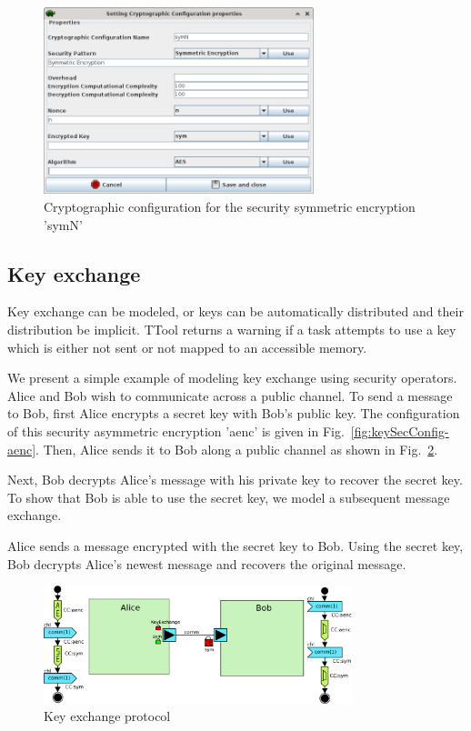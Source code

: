 \documentclass{llncs}
\begin{document}
\begin{figure}[htbp]
	\centering	\includegraphics[width=0.7\textwidth]{figures/securityStuff/encrypt-config-nonce-symN.png}
	\caption{Cryptographic configuration for the security symmetric encryption 'symN'}
	\label{fig:nonceSecConfig-symN}
\end{figure}

\subsection{Key exchange}
Key exchange can be modeled, or keys can be automatically distributed and their distribution be implicit.
TTool returns a warning if a task attempts to use a key which is either not sent or not mapped to an accessible memory. 

We present a simple example of modeling key exchange using security operators.
 Alice
and Bob wish to communicate across a public channel. To send a message to Bob, first Alice encrypts a secret key with Bob's public key. The configuration of this security asymmetric encryption 'aenc' is given in Fig.~\ref{fig:keySecConfig-aenc}.  
Then, Alice sends it to Bob along a public channel as shown in
Fig.~\ref{fig:keyComp}.

Next, Bob decrypts Alice's message with his private key to recover the secret key. To show that Bob is able to use the
secret key, we model a subsequent message exchange. 

Alice sends a message encrypted with the secret key to Bob. Using the secret key, Bob decrypts Alice's newest message
and recovers the original message.


\begin{figure}[htbp]
	\centering	\includegraphics[width=0.8\textwidth]{figures/securityStuff/keyComp.pdf}
	\caption{Key exchange protocol}
	\label{fig:keyComp}
\end{figure}
\end{document}
